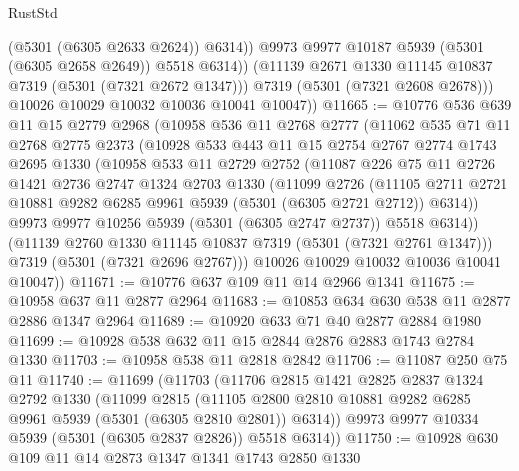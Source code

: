 \begin{lexlean}{RustStd}
\begin{coremodule}
                  (@5301 (@6305 @2633 @2624))
                  @6314))
              @9973
              @9977
              @10187
              @5939
              (@5301 (@6305 @2658 @2649))
              @5518
              @6314))
          (@11139 @2671 @1330 @11145 @10837 @7319 (@5301 (@7321 @2672 @1347)))
          @7319
          (@5301 (@7321 @2608 @2678)))
        @10026
        @10029
        @10032
        @10036
        @10041
        @10047))
@11665 := @10776
    @536
    @639
    @11
    @15
    @2779
    @2968
    (@10958
      @536
      @11
      @2768
      @2777
      (@11062
        @535
        @71
        @11
        @2768
        @2775
        @2373
        (@10928
          @533
          @443
          @11
          @15
          @2754
          @2767
          @2774
          @1743
          @2695
          @1330
          (@10958
            @533
            @11
            @2729
            @2752
            (@11087
              @226
              @75
              @11
              @2726
              @1421
              @2736
              @2747
              @1324
              @2703
              @1330
              (@11099
                @2726
                (@11105
                  @2711
                  @2721
                  @10881
                  @9282
                  @6285
                  @9961
                  @5939
                  (@5301 (@6305 @2721 @2712))
                  @6314))
              @9973
              @9977
              @10256
              @5939
              (@5301 (@6305 @2747 @2737))
              @5518
              @6314))
          (@11139 @2760 @1330 @11145 @10837 @7319 (@5301 (@7321 @2761 @1347)))
          @7319
          (@5301 (@7321 @2696 @2767)))
        @10026
        @10029
        @10032
        @10036
        @10041
        @10047))
@11671 := @10776 @637 @109 @11 @14 @2966 @1341
@11675 := @10958 @637 @11 @2877 @2964
@11683 := @10853 @634 @630 @538 @11 @2877 @2886 @1347 @2964
@11689 := @10920 @633 @71 @40 @2877 @2884 @1980
@11699 := @10928 @538 @632 @11 @15 @2844 @2876 @2883 @1743 @2784 @1330
@11703 := @10958 @538 @11 @2818 @2842
@11706 := @11087 @250 @75 @11
@11740 := @11699
    (@11703
      (@11706
        @2815
        @1421
        @2825
        @2837
        @1324
        @2792
        @1330
        (@11099
          @2815
          (@11105 @2800 @2810 @10881 @9282 @6285 @9961 @5939 (@5301 (@6305 @2810 @2801)) @6314))
        @9973
        @9977
        @10334
        @5939
        (@5301 (@6305 @2837 @2826))
        @5518
        @6314))
@11750 := @10928 @630 @109 @11 @14 @2873 @1347 @1341 @1743 @2850 @1330

\end{coremodule}
\end{lexlean}
